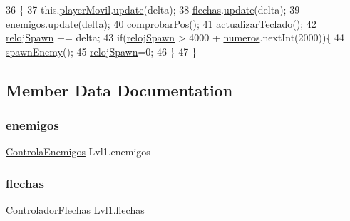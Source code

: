 \begin{DoxyCode}
36                                                                                                       \{
37       this.\mbox{\hyperlink{class_lvl1_a7ac9bfa1d79eb27089228a152072efd2}{playerMovil}}.\mbox{\hyperlink{class_sprite_movil_a7d40c2a76b0be777aa231a971007637e}{update}}(delta);
38       \mbox{\hyperlink{class_lvl1_a252ada5a964b9a5b559aaa0773cb5643}{flechas}}.\mbox{\hyperlink{class_controlador_flechas_afcc63da58b6dd22715c017593731577e}{update}}(delta);
39       \mbox{\hyperlink{class_lvl1_af3ba4e431a1c46ce7ee27eaf566c5978}{enemigos}}.\mbox{\hyperlink{class_controla_enemigos_a0f43235e03225c9fbd077c5bfd2df923}{update}}(delta);
40       \mbox{\hyperlink{class_lvl1_a78b06f34feedd942b1af193cedb0ed1e}{comprobarPos}}();
41       \mbox{\hyperlink{class_lvl1_aa60cbf1fa3189b5e57d8c0171c4d634c}{actualizarTeclado}}();
42       \mbox{\hyperlink{class_lvl1_a414b04482f33deead358ca7f1b5c6de0}{relojSpawn}} += delta;
43       \textcolor{keywordflow}{if}(\mbox{\hyperlink{class_lvl1_a414b04482f33deead358ca7f1b5c6de0}{relojSpawn}} > 4000 + \mbox{\hyperlink{class_lvl1_ad5839902bce539ea6f65fd915b1c5e8a}{numeros}}.nextInt(2000))\{
44       \mbox{\hyperlink{class_lvl1_a2f09cab636e2bf584a6f362c0f84c29f}{spawnEnemy}}();
45       \mbox{\hyperlink{class_lvl1_a414b04482f33deead358ca7f1b5c6de0}{relojSpawn}}=0;
46       \}
47     \}
\end{DoxyCode}


\subsection{Member Data Documentation}
\mbox{\label{class_lvl1_af3ba4e431a1c46ce7ee27eaf566c5978}} 
\subsubsection{\texorpdfstring{enemigos}{enemigos}}
{\footnotesize\ttfamily \mbox{\hyperlink{class_controla_enemigos}{Controla\+Enemigos}} Lvl1.\+enemigos\hspace{0.3cm}{\ttfamily [private]}}

\mbox{\label{class_lvl1_a252ada5a964b9a5b559aaa0773cb5643}} 
\subsubsection{\texorpdfstring{flechas}{flechas}}
{\footnotesize\ttfamily \mbox{\hyperlink{class_controlador_flechas}{Controlador\+Flechas}} Lvl1.\+flechas\hspace{0.3cm}{\ttfamily [private]}}

